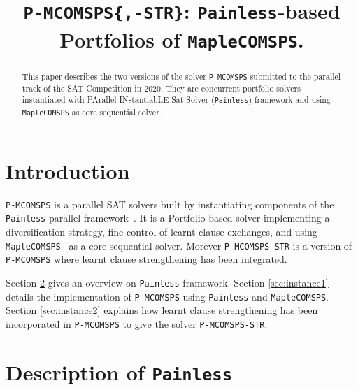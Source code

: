 \documentclass[conference]{IEEEtran}
\newcommand{\painless}[0]{\texttt{Painless}\xspace}
\newcommand{\maple}[0]{\texttt{MapleCOMSPS}\xspace}
\newcommand{\pmcomsps}[0]{\texttt{P-MCOMSPS}\xspace}
\newcommand{\preduce}[0]{\texttt{P-MCOMSPS-STR}\xspace}
\begin{document}
\title{\texttt{P-MCOMSPS\{,-STR\}}: \painless-based Portfolios of \maple.}

\author{
}

\maketitle

\begin{abstract}
   This paper describes the two versions of the solver \pmcomsps submitted to
   the parallel track of the SAT Competition in 2020. They are concurrent
   portfolio solvers instantiated with PArallel INstantiabLE Sat Solver
   (\painless) framework and using \maple as core sequential solver.
\end{abstract}

\IEEEpeerreviewmaketitle

\section{Introduction}

\pmcomsps is a parallel SAT solvers built by instantiating components of the
\painless parallel framework~\cite{painless_17}. It is a Portfolio-based solver
implementing a diversification strategy, fine control of learnt clause
exchanges, and using \maple~\cite{maplecomsps_17} as a core sequential solver.
Morever \preduce is a version of \pmcomsps where learnt clause strengthening
has been integrated.

Section \ref{sec:painless} gives an overview on \painless framework. Section
\ref{sec:instance1} details the implementation of \pmcomsps using \painless and
\maple. Section \ref{sec:instance2} explains how learnt clause strengthening
has been incorporated in \pmcomsps to give the solver \preduce.

\section{Description of \painless}
\label{sec:painless}
\end{document}
